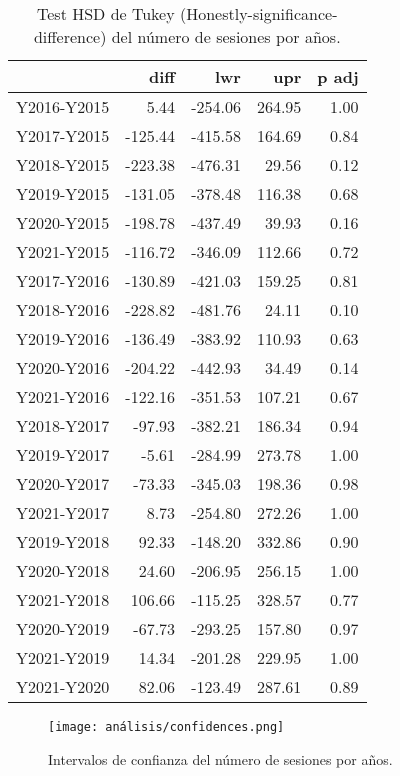 \begin{table}[ht]
\centering
\caption{Test HSD de Tukey (Honestly-significance-difference) del número de sesiones por años.}
\label{tab:Tukeynumsessions}
\begin{tabular}{rrrrr}
  \hline
 & diff & lwr & upr & p adj \\ 
  \hline
Y2016-Y2015 & 5.44 & -254.06 & 264.95 & 1.00 \\ 
  Y2017-Y2015 & -125.44 & -415.58 & 164.69 & 0.84 \\ 
  Y2018-Y2015 & -223.38 & -476.31 & 29.56 & 0.12 \\ 
  Y2019-Y2015 & -131.05 & -378.48 & 116.38 & 0.68 \\ 
  Y2020-Y2015 & -198.78 & -437.49 & 39.93 & 0.16 \\ 
  Y2021-Y2015 & -116.72 & -346.09 & 112.66 & 0.72 \\ 
  Y2017-Y2016 & -130.89 & -421.03 & 159.25 & 0.81 \\ 
  Y2018-Y2016 & -228.82 & -481.76 & 24.11 & 0.10 \\ 
  Y2019-Y2016 & -136.49 & -383.92 & 110.93 & 0.63 \\ 
  Y2020-Y2016 & -204.22 & -442.93 & 34.49 & 0.14 \\ 
  Y2021-Y2016 & -122.16 & -351.53 & 107.21 & 0.67 \\ 
  Y2018-Y2017 & -97.93 & -382.21 & 186.34 & 0.94 \\ 
  Y2019-Y2017 & -5.61 & -284.99 & 273.78 & 1.00 \\ 
  Y2020-Y2017 & -73.33 & -345.03 & 198.36 & 0.98 \\ 
  Y2021-Y2017 & 8.73 & -254.80 & 272.26 & 1.00 \\ 
  Y2019-Y2018 & 92.33 & -148.20 & 332.86 & 0.90 \\ 
  Y2020-Y2018 & 24.60 & -206.95 & 256.15 & 1.00 \\ 
  Y2021-Y2018 & 106.66 & -115.25 & 328.57 & 0.77 \\ 
  Y2020-Y2019 & -67.73 & -293.25 & 157.80 & 0.97 \\ 
  Y2021-Y2019 & 14.34 & -201.28 & 229.95 & 1.00 \\ 
  Y2021-Y2020 & 82.06 & -123.49 & 287.61 & 0.89 \\ 
   \hline
\end{tabular}
\end{table}

\begin{figure}[H]
    \centering
    \texttt{[image: análisis/confidences.png]}
    \caption{Intervalos de confianza del número de sesiones por años.}
    \label{fig:confidencenumsessions}
\end{figure}

